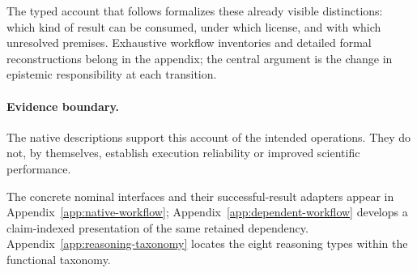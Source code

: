 The typed account that follows formalizes these already visible distinctions: which kind of result can be consumed, under which license, and with which unresolved premises. Exhaustive workflow inventories and detailed formal reconstructions belong in the appendix; the central argument is the change in epistemic responsibility at each transition.

\paragraph{Evidence boundary.}
The native descriptions support this account of the intended operations. They do not, by themselves, establish execution reliability or improved scientific performance.

The concrete nominal interfaces and their successful-result adapters appear in Appendix~\ref{app:native-workflow}; Appendix~\ref{app:dependent-workflow} develops a claim-indexed presentation of the same retained dependency. Appendix~\ref{app:reasoning-taxonomy} locates the eight reasoning types within the functional taxonomy.
